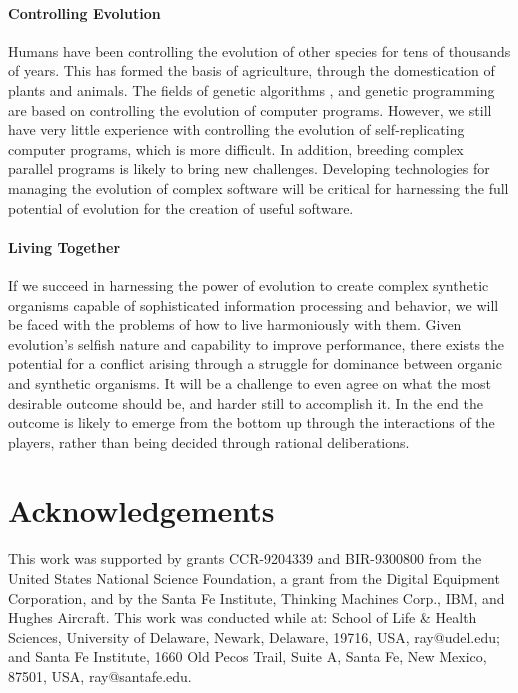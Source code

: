 \paragraph{Controlling Evolution}

Humans have been controlling the evolution of other species for tens
of thousands of years.  This has formed the basis of agriculture, through
the domestication of plants and animals.  The fields of genetic
algorithms \cite{Gold,Holl}, and genetic programming \cite{Koza} are
based on controlling the evolution of computer programs.  However, we
still have very little experience with controlling the evolution of
self-replicating computer programs, which is more difficult.  In addition,
breeding complex parallel programs is likely to bring new challenges.
Developing technologies for managing the evolution of complex software
will be critical for harnessing the full potential of evolution for
the creation of useful software.

\paragraph{Living Together}

If we succeed in harnessing the power of evolution to create complex
synthetic organisms capable of sophisticated information processing
and behavior, we will be faced with the problems of how to live
harmoniously with them.  Given evolution's selfish nature and
capability to improve performance, there exists the potential for
a conflict arising through a struggle for dominance between organic
and synthetic organisms.  It will be a challenge to even agree on
what the most desirable outcome should be, and harder still to
accomplish it.  In the end the outcome is likely to emerge from the
bottom up through the interactions of the players, rather than being
decided through rational deliberations.

\section{Acknowledgements}

This work was supported by grants CCR-9204339 and BIR-9300800
from the United States National Science Foundation, a grant from the
Digital Equipment Corporation, and by the Santa Fe Institute, Thinking
Machines Corp., IBM, and Hughes Aircraft.
This work was conducted while at:
School of Life \& Health Sciences, University of Delaware, Newark,
Delaware, 19716, USA, ray@udel.edu;
and Santa Fe Institute, 1660 Old Pecos Trail, Suite A, Santa Fe,
New Mexico, 87501, USA, ray@santafe.edu.

